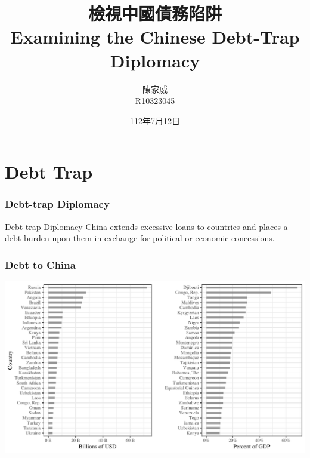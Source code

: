 \documentclass[mathserif]{beamer}
\title{檢視中國債務陷阱\\Examining the Chinese Debt-Trap Diplomacy}
\author{陳家威\\{\small R10323045}}
\date{112年7月12日}
\begin{document}
    \begin{frame}

        \maketitle

    \end{frame}

    \section{Debt Trap}
    \begin{frame}
        \frametitle{Debt-trap Diplomacy}

        \begin{block}
            {Debt-trap Diplomacy}
            China extends excessive loans to countries and places a debt burden upon them in exchange
            for political or economic concessions.
        \end{block}
    \end{frame}

    \begin{frame}
        \frametitle{Debt to China}
            \includegraphics[width = \textwidth]{fig/debt-level-by-country.pdf}
    \end{frame}
\end{document}
